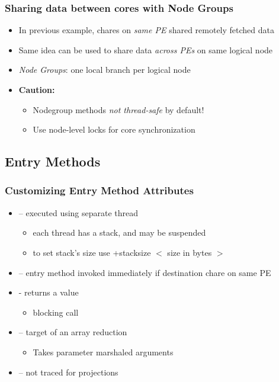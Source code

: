 \begin{frame}[fragile]
  \frametitle{Sharing data between cores with Node Groups}
  \begin{itemize}
    \item In previous example, chares on {\em same PE} shared remotely fetched data
    \item Same idea can be used to share data {\em across PEs} on same logical node
    \item {\em Node Groups}: one local branch per logical node
    \item {\bf Caution:}
    \begin{itemize}
      \item Nodegroup methods {\em not thread-safe} by default! 
      \item Use node-level locks for core synchronization
    \end{itemize}
  \end{itemize}
\end{frame}

\subsection[Entry Methods]{Entry Methods}
\begin{frame}[fragile]
  \frametitle{Customizing Entry Method Attributes}
  \begin{itemize}
    \item {} – executed using separate thread
    \begin{itemize}
      \item each thread has a stack, and may be suspended
      \item to set stack’s size use +stacksize $<$ size in bytes $>$
    \end{itemize}
    \item {} – entry method invoked immediately if destination chare on same PE
    \item {} - returns a value
    \begin{itemize}
      \item blocking call
    \end{itemize}
    \item {} – target of an array reduction
    \begin{itemize}
      \item Takes parameter marshaled arguments
    \end{itemize}
    \item {} – not traced for projections
  \end{itemize}
\end{frame}

